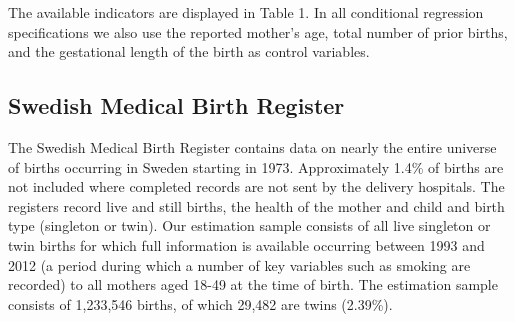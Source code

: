 \documentclass{nature}
\begin{document}
\begin{linenumbers}

The available indicators are displayed in Table 1. In all conditional regression specifications we also use the reported mother's age, total number of prior births, and the gestational length of the birth as control variables\cite{Hall2003}.  %
  

\subsection{Swedish Medical Birth Register}
The Swedish Medical Birth Register contains data on nearly the entire universe of births occurring in Sweden starting in 1973\cite{EPC2003}.  Approximately 1.4\% of births are not included where completed records are not sent by the delivery hospitals\cite{EPC2003}. The registers record live and still births, the health of the mother and child and birth type (singleton or twin).  Our estimation sample consists of all live singleton or twin births for which full information is available occurring between 1993 and 2012 (a period during which a number of key variables such as smoking are recorded) to all mothers aged 18-49 at the time of birth.  The estimation sample consists of 1,233,546 births, of which 29,482 are twins (2.39\%). 


\end{linenumbers}
\end{document}
